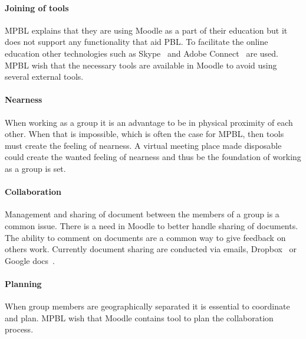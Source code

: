 \paragraph{Joining of tools} MPBL explains that they are using Moodle as a part of their education but it does not support any functionality that aid PBL. 
To facilitate the online education other technologies such as Skype~\cite{skype} and Adobe Connect~\cite{adobe} are used. 
MPBL wish that the necessary tools are available in Moodle to avoid using several external tools.     

\paragraph{Nearness} When working as a group it is an advantage to be in physical proximity of each other.
When that is impossible, which is often the case for MPBL, then tools must create the feeling of nearness. 
A virtual meeting place made disposable could create the wanted feeling of nearness and thus be the foundation of working as a group is set. 

\paragraph{Collaboration} Management and sharing of document between the members of a group is a common issue. 
There is a need in Moodle to better handle sharing of documents. The ability to comment on documents are a common way to give feedback on others work. 
Currently document sharing are conducted via emails, Dropbox~\cite{dropbox} or Google docs~\cite{googledocs}.


\paragraph{Planning} When group members are geographically separated it is essential to coordinate and plan.
MPBL wish that Moodle contains tool to plan the collaboration process.



\begin{comment}
In the preliminary phase of working with Electronic-learning (E-learning) it is important for us to ensure that we are in fact working with problems that are relevant in the E-learning and Problem Based Learning (PBL) fields of study, as we are aiming at improving the overall way that the chosen E-learning environment at Aalborg University (AAU), namely Moodle, supports PBL. 
Because AAU is renowned for its implementation of PBL, we do not have to look very far to find some of the leading experts in this field.
\end{comment}
\begin{comment}
To optian domain knowlage of how moodle and Aapbl works 
Domain knowlage
In the initial phase of this project we conducted two interviews with xxx from ELSA\cite{x} and yyy from MPBL. 

interviews
*ELSA
*MPBL

*Baseret på de ting de fortalte ->
*Kommunication
* 
*Fildeling

Opdeling i de 4 områder

*akritektur
\end{comment}

